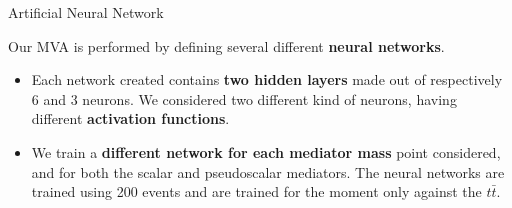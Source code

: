\documentclass[handout,8 pt]{beamer}
\begin{document}
\begin{frame}{Artificial Neural Network}

	\justifying
	Our MVA is performed by defining several different \textbf{neural networks}.
	\begin{itemize}
	\justifying
	\item Each network created contains \textbf{two hidden layers} made out of respectively 6 and 3 neurons. We considered two different kind of neurons, having different \textbf{activation functions}. %
	\item We train a \textbf{different network for each mediator mass} point considered, and for both the scalar and pseudoscalar mediators. The neural networks are trained using 200 events and are trained for the moment only against the $t \bar t$.
	\end{itemize} \vfill


\end{frame}
\end{document}
